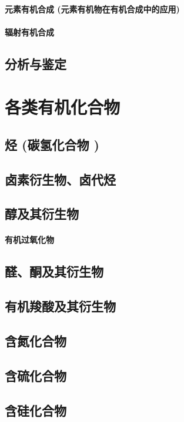 \documentclass[UTF8]{../03-Chemistry}
\begin{document}
        \subsubsection{元素有机合成 (元素有机物在有机合成中的应用)}
        \subsubsection{辐射有机合成}
\section{分析与鉴定}









\chapter{各类有机化合物}
\section{烃 (碳氢化合物 )}
\section{卤素衍生物、卤代烃}
\section{醇及其衍生物}
    \subsubsection{有机过氧化物}
\section{醛、酮及其衍生物}
\section{有机羧酸及其衍生物}
\section{含氮化合物}
\section{含硫化合物}
\section{含硅化合物}
\end{document}
